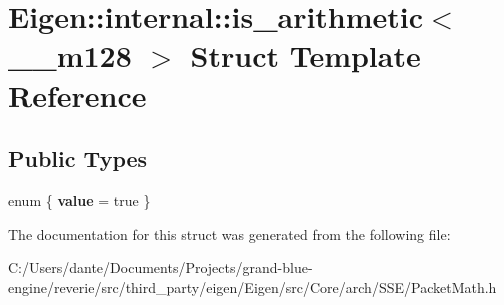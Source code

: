 \hypertarget{struct_eigen_1_1internal_1_1is__arithmetic_3_01____m128_01_4}{}\section{Eigen\+::internal\+::is\+\_\+arithmetic$<$ \+\_\+\+\_\+m128 $>$ Struct Template Reference}
\label{struct_eigen_1_1internal_1_1is__arithmetic_3_01____m128_01_4}
\subsection*{Public Types}
\begin{DoxyCompactItemize}
\item 
\mbox{\label{struct_eigen_1_1internal_1_1is__arithmetic_3_01____m128_01_4_adfb048fc46cd3242fb648d48e586a8db}} 
enum \{ {\bfseries value} = true
 \}
\end{DoxyCompactItemize}


The documentation for this struct was generated from the following file\+:\begin{DoxyCompactItemize}
\item 
C\+:/\+Users/dante/\+Documents/\+Projects/grand-\/blue-\/engine/reverie/src/third\+\_\+party/eigen/\+Eigen/src/\+Core/arch/\+S\+S\+E/Packet\+Math.\+h\end{DoxyCompactItemize}
